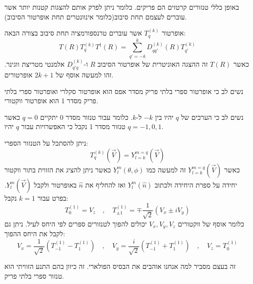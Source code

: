 \documentclass{tstextbook}
\begin{document}
\begin{remark}
באופן כללי טנזורים קרטזים הם פריקים. כלומר ניתן לפרק אותם להצגות קטנות יותר אשר עוברים לעצמם תחת סיבוב(כלומר אינוונטרים תחת אופרטור הסיבוב).

\end{remark}
\begin{definition}
אופרטור \(T_{q}^{(k)}\) אשר עוברים טרנספורמציה תחת סיבוב בצורה הבאה:
$$T(R)T_{q}^{(k)}T^{\dagger}(R) =\sum_{q'=-k}^{k}D^{(k)}_{qq'}(R)T_{q'}^{(k)}$$
כאשר \(T(R)\) זה ההצגה האוניטרית של אופרטור הסיבוב \(R\) ו-\(D_{q'q}^{(k)}\) אלמנטי מטריצת ווגינר. זהו למעשה אוסף של \(2k+1\) אופרטורים.

\end{definition}
\begin{remark}
נשים לב כי אופרטור ספרי בלתי פריק מסדר אפס הוא אופרטור סקלרי ואופרטור ספרי בלתי פריק מסדר 1 הוא אופרטור ווקטורי.

\end{remark}
\begin{remark}
נשים לב כי הערכים של \(q\) יהיו בין \(-k\) ל-\(k\). כלומר עבור טנזור מסדר 0 יתקיים \(q=0\) כאשר טנזור מסדר 1 נקבל כי האפשרויות עבור \(q\) יהיו \(q=-1,0,1\).

\end{remark}
\begin{example}
ניתן להסתכל על הטנזור הספרי:
$$T_{q}^{(k)}(\vec{V})=Y_{l=k}^{m=q}(\vec{V})$$
כאשר \(Y_{l=k}^{m=q}\left( \vec{V} \right)\) זה למעשה כמו \(Y_{l}^{m}\left( \theta,\phi \right)\) כאשר ניתן להציג את הזווית בתור ווקטור יחידה על ספרת היחידה ולכתוב \(Y_{l}^{m}\left( \hat{n} \right)\) ואז להחליף את \(\hat{n}\) באופרטור ולקבל \(Y_{l}^{m}\left( \vec{V} \right)\). בפרט עבור \(k=1\) נקבל:
$$T_{0}^{(1)}=V_{z}\quad,\quad T_{\pm1}^{(1)}=\mp\frac{1}{\sqrt{2}}(V_{x}\pm i V_{y})$$
כלומר אוסף של ווקטורים \(V_{x},V_{y},V_{z}\) יכולים להפוך לטנזורים ספרים לפי היחס לעיל. ניתן גם לקבל את היחס ההפוך:
$$V_{x}=\frac{1}{\sqrt{2}}(T_{-1}^{(1)}-T_{1}^{(1)})\quad,\quad V_{y}=\frac{i}{\sqrt{2}}(T_{-1}^{(1)}+T_{1}^{(1)})\quad,\quad V_{z}=T_{0}^{(1)}$$

\end{example}
\begin{remark}
זה בעצם מסביר למה אנחנו אוהבים את הבסיס הפולארי. זה כיוון בהם התנע הזוויתי הוא טנזור ספרי בלתי פריק.

\end{remark}
\end{document}

